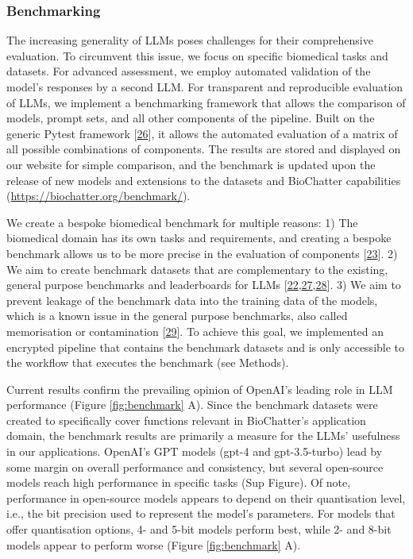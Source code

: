 \hypertarget{benchmarking}{%
\subsubsection{Benchmarking}\label{benchmarking}}

The increasing generality of LLMs poses challenges for their comprehensive evaluation.
To circumvent this issue, we focus on specific biomedical tasks and datasets.
For advanced assessment, we employ automated validation of the model's responses by a second LLM.
For transparent and reproducible evaluation of LLMs, we implement a benchmarking framework that allows the comparison of models, prompt sets, and all other components of the pipeline.
Built on the generic Pytest framework {[}\protect\hyperlink{ref-14upAJPXR}{26}{]}, it allows the automated evaluation of a matrix of all possible combinations of components.
The results are stored and displayed on our website for simple comparison, and the benchmark is updated upon the release of new models and extensions to the datasets and BioChatter capabilities (\url{https://biochatter.org/benchmark/}).

We create a bespoke biomedical benchmark for multiple reasons:
1) The biomedical domain has its own tasks and requirements, and creating a bespoke benchmark allows us to be more precise in the evaluation of components {[}\protect\hyperlink{ref-uYvzQA7w}{23}{]}.
2) We aim to create benchmark datasets that are complementary to the existing, general purpose benchmarks and leaderboards for LLMs {[}\protect\hyperlink{ref-LE2GwIqT}{22},\protect\hyperlink{ref-KONKs6Pw}{27},\protect\hyperlink{ref-foK1oImy}{28}{]}.
3) We aim to prevent leakage of the benchmark data into the training data of the models, which is a known issue in the general purpose benchmarks, also called memorisation or contamination {[}\protect\hyperlink{ref-yT66jV6G}{29}{]}.
To achieve this goal, we implemented an encrypted pipeline that contains the benchmark datasets and is only accessible to the workflow that executes the benchmark (see Methods).

Current results confirm the prevailing opinion of OpenAI's leading role in LLM performance (Figure \ref{fig:benchmark} A).
Since the benchmark datasets were created to specifically cover functions relevant in BioChatter's application domain, the benchmark results are primarily a measure for the LLMs' usefulness in our applications.
OpenAI's GPT models (gpt-4 and gpt-3.5-turbo) lead by some margin on overall performance and consistency, but several open-source models reach high performance in specific tasks (Sup Figure).
Of note, performance in open-source models appears to depend on their quantisation level, i.e., the bit precision used to represent the model's parameters.
For models that offer quantisation options, 4- and 5-bit models perform best, while 2- and 8-bit models appear to perform worse (Figure \ref{fig:benchmark} A).


